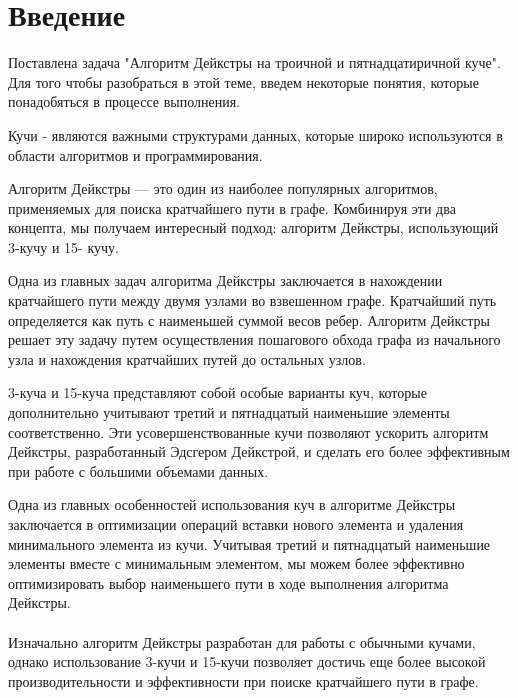 \documentclass[a4paper, 12pt]{article}
\theoremstyle{definition}
\begin{document}
	\tableofcontents{}
	\clearpage
	
	\section{Введение}
	
	Поставлена задача "Алгоритм Дейкстры на троичной и пятнадцатиричной куче". Для того чтобы разобраться в этой теме, введем некоторые понятия, которые понадобяться в процессе выполнения. \newline
	
	Кучи - являются важными структурами данных, которые широко используются в области алгоритмов и программирования. \newline
	
	Алгоритм Дейкстры —
	это один из наиболее популярных алгоритмов, применяемых для поиска
	кратчайшего пути в графе. Комбинируя эти два концепта, мы получаем
	интересный подход: алгоритм Дейкстры, использующий 3-кучу и 15-
	кучу.\newline
	
	Одна из главных задач алгоритма Дейкстры заключается в нахождении
	кратчайшего пути между двумя узлами во взвешенном графе. Кратчайший
	путь определяется как путь с наименьшей суммой весов ребер. Алгоритм
	Дейкстры решает эту задачу путем осуществления пошагового обхода
	графа из начального узла и нахождения кратчайших путей до остальных
	узлов. \newline
	
	3-куча и 15-куча представляют собой
	особые варианты куч, которые дополнительно учитывают третий и пятнадцатый
	наименьшие элементы соответственно. Эти усовершенствованные кучи
	позволяют ускорить алгоритм Дейкстры, разработанный Эдсгером Дейкстрой,
	и сделать его более эффективным при работе с большими объемами
	данных. \newline
	
	Одна из главных особенностей использования куч в алгоритме Дейкстры
	заключается в оптимизации операций вставки нового элемента и удаления
	минимального элемента из кучи. Учитывая третий и пятнадцатый наименьшие
	элементы вместе с минимальным элементом, мы можем более эффективно
	оптимизировать выбор наименьшего пути в ходе выполнения алгоритма
	Дейкстры.\\ \\
	Изначально алгоритм Дейкстры разработан для работы с обычными
	кучами, однако использование 3-кучи и 15-кучи позволяет достичь еще
	более высокой производительности и эффективности при поиске кратчайшего
	пути в графе. \newline
	
\end{document}

